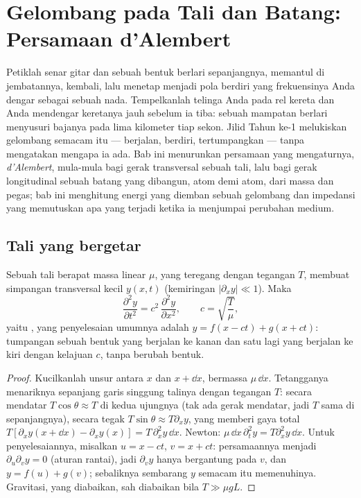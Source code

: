 \chapter{Gelombang pada Tali dan Batang: Persamaan d'Alembert}\label{ch:b2:waves-on-strings}

Petiklah senar gitar dan sebuah bentuk berlari sepanjangnya, memantul di
jembatannya, kembali, lalu menetap menjadi pola berdiri yang
frekuensinya Anda dengar sebagai sebuah nada. Tempelkanlah telinga Anda
pada rel kereta dan Anda mendengar keretanya jauh sebelum ia tiba: sebuah
mampatan berlari menyusuri bajanya pada lima kilometer tiap sekon. Jilid
Tahun ke-1 melukiskan gelombang semacam itu --- berjalan, berdiri,
tertumpangkan --- tanpa mengatakan mengapa ia ada. Bab ini menurunkan
persamaan yang mengaturnya, \emph{ d'Alembert},
mula-mula bagi gerak transversal sebuah tali, lalu bagi gerak
longitudinal sebuah batang yang dibangun, atom demi atom, dari massa dan
pegas; bab ini menghitung energi yang diemban sebuah gelombang dan
impedansi yang memutuskan apa yang terjadi ketika ia menjumpai perubahan
medium.

\section{Tali yang bergetar}

\begin{theorem}\label{thm:b2:waves-on-strings:equation}
Sebuah tali berapat massa linear $\mu$, yang teregang dengan tegangan $T$,
membuat simpangan transversal kecil $y(x, t)$ (kemiringan $|\partial_xy| \ll 1$). Maka
\[
\frac{\partial^2y}{\partial t^2} = c^2\,\frac{\partial^2y}{\partial x^2} ,
\qquad c = \sqrt{\frac{T}{\mu}} ,
\]
yaitu \emph{}, yang penyelesaian umumnya adalah $y = f(x - ct)
+ g(x + ct)$: tumpangan sebuah bentuk yang berjalan ke kanan dan
satu lagi yang berjalan ke kiri dengan kelajuan $c$, tanpa berubah bentuk.
\end{theorem}

\begin{proof}
Kucilkanlah unsur antara $x$ dan $x + \dd x$, bermassa $\mu\,\dd x$.
Tetangganya menariknya sepanjang garis singgung talinya dengan tegangan $T$:
secara mendatar $T\cos\theta \approx T$ di kedua ujungnya (tak ada gerak mendatar, jadi
$T$ sama di sepanjangnya), secara tegak $T\sin\theta \approx T\partial_xy$, yang
memberi gaya total $T[\partial_xy(x + \dd x) - \partial_xy(x)] = T\,\partial_x^2y\,\dd x$.
Newton: $\mu\,\dd x\,\partial_t^2y = T\partial_x^2y\,\dd x$. Untuk penyelesaiannya, misalkan
$u = x - ct$, $v = x + ct$: persamaannya menjadi $\partial_u\partial_vy = 0$
(aturan rantai), jadi $\partial_vy$ hanya bergantung pada $v$, dan $y = f(u) + g(v)$;
sebaliknya sembarang $y$ semacam itu memenuhinya. Gravitasi, yang diabaikan, sah
diabaikan bila $T \gg \mu gL$.
\end{proof}

